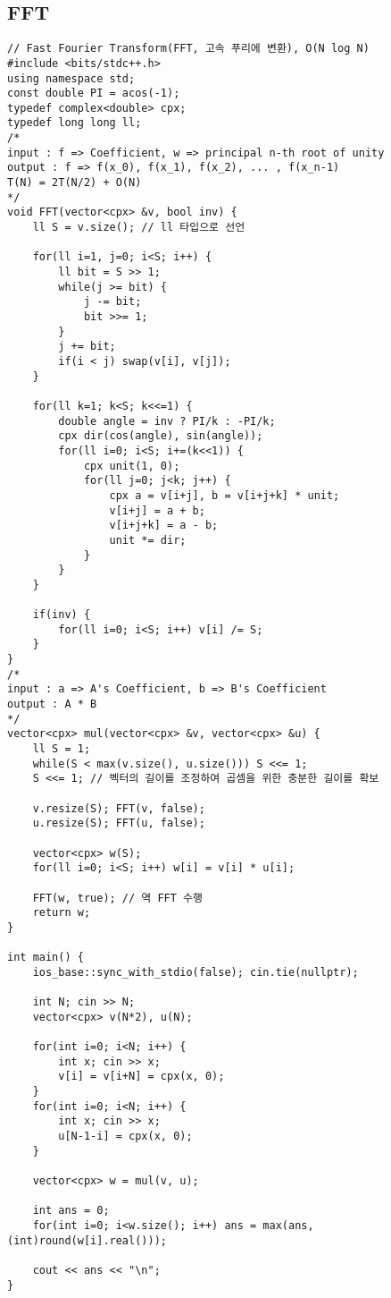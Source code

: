 \documentclass[landscape, 8pt, a4paper, oneside, twocolumn]{extarticle}
\begin{document}
    \subsection {FFT}
    \begin{verbatim}
// Fast Fourier Transform(FFT, 고속 푸리에 변환), O(N log N)
#include <bits/stdc++.h>
using namespace std;
const double PI = acos(-1);
typedef complex<double> cpx;
typedef long long ll;
/*
input : f => Coefficient, w => principal n-th root of unity
output : f => f(x_0), f(x_1), f(x_2), ... , f(x_n-1)
T(N) = 2T(N/2) + O(N)
*/
void FFT(vector<cpx> &v, bool inv) {
    ll S = v.size(); // ll 타입으로 선언

    for(ll i=1, j=0; i<S; i++) {
        ll bit = S >> 1;
        while(j >= bit) {
            j -= bit;
            bit >>= 1;
        }
        j += bit;
        if(i < j) swap(v[i], v[j]);
    }

    for(ll k=1; k<S; k<<=1) {
        double angle = inv ? PI/k : -PI/k;
        cpx dir(cos(angle), sin(angle));
        for(ll i=0; i<S; i+=(k<<1)) {
            cpx unit(1, 0);
            for(ll j=0; j<k; j++) {
                cpx a = v[i+j], b = v[i+j+k] * unit;
                v[i+j] = a + b;
                v[i+j+k] = a - b;
                unit *= dir;
            }
        }
    }

    if(inv) {
        for(ll i=0; i<S; i++) v[i] /= S;
    }
}
/*
input : a => A's Coefficient, b => B's Coefficient
output : A * B
*/
vector<cpx> mul(vector<cpx> &v, vector<cpx> &u) {
    ll S = 1;
    while(S < max(v.size(), u.size())) S <<= 1;
    S <<= 1; // 벡터의 길이를 조정하여 곱셈을 위한 충분한 길이를 확보

    v.resize(S); FFT(v, false);
    u.resize(S); FFT(u, false);

    vector<cpx> w(S);
    for(ll i=0; i<S; i++) w[i] = v[i] * u[i];

    FFT(w, true); // 역 FFT 수행
    return w;
}

int main() {
  	ios_base::sync_with_stdio(false); cin.tie(nullptr);

    int N; cin >> N;
    vector<cpx> v(N*2), u(N);

    for(int i=0; i<N; i++) {
        int x; cin >> x;
        v[i] = v[i+N] = cpx(x, 0);
    }
    for(int i=0; i<N; i++) {
        int x; cin >> x;
        u[N-1-i] = cpx(x, 0);
    }

    vector<cpx> w = mul(v, u);

    int ans = 0;
    for(int i=0; i<w.size(); i++) ans = max(ans, (int)round(w[i].real()));

    cout << ans << "\n";
}
    \end{verbatim}
\end{document}
